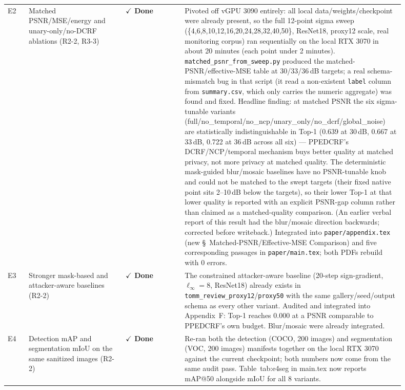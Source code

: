 \documentclass[11pt]{article}
\newcommand{\done}{\textcolor{DoneGreen}{\textbf{$\checkmark$ Done}}}
\begin{document}
\begin{longtable}{@{}p{0.05\linewidth}p{0.23\linewidth}p{0.14\linewidth}p{0.48\linewidth}@{}}
E2 & Matched PSNR/MSE/energy and unary-only/no-DCRF ablations (R2-2, R3-3) & \done & Pivoted off vGPU 3090 entirely: all local data/weights/checkpoint were already present, so the full 12-point sigma sweep (\{4,6,8,10,12,16,20,24,28,32,40,50\}, ResNet18, proxy12 scale, real monitoring corpus) ran sequentially on the local RTX 3070 in about 20 minutes (each point under 2 minutes). \texttt{matched\_psnr\_from\_sweep.py} produced the matched-PSNR/effective-MSE table at 30/33/36\,dB targets; a real schema-mismatch bug in that script (it read a non-existent \texttt{label} column from \texttt{summary.csv}, which only carries the numeric aggregate) was found and fixed. Headline finding: at matched PSNR the six sigma-tunable variants (full/no\_temporal/no\_ncp/unary\_only/no\_dcrf/global\_noise) are statistically indistinguishable in Top-1 (0.639 at 30\,dB, 0.667 at 33\,dB, 0.722 at 36\,dB across all six) --- PPEDCRF's DCRF/NCP/temporal mechanism buys better quality at matched privacy, not more privacy at matched quality. The deterministic mask-guided blur/mosaic baselines have no PSNR-tunable knob and could not be matched to the swept targets (their fixed native point sits 2--10\,dB below the targets), so their lower Top-1 at that lower quality is reported with an explicit PSNR-gap column rather than claimed as a matched-quality comparison. (An earlier verbal report of this result had the blur/mosaic direction backwards; corrected before writeback.) Integrated into \texttt{paper/appendix.tex} (new \S~Matched-PSNR/Effective-MSE Comparison) and five corresponding passages in \texttt{paper/main.tex}; both PDFs rebuild with 0 errors. \\
E3 & Stronger mask-based and attacker-aware baselines (R2-2) & \done & The constrained attacker-aware baseline (20-step sign-gradient, $\ell_\infty{=}8$, ResNet18) already exists in \texttt{tomm\_review\_proxy12}/\texttt{proxy50} with the same gallery/seed/output schema as every other variant. Audited and integrated into Appendix~F: Top-1 reaches 0.000 at a PSNR comparable to PPEDCRF's own budget. Blur/mosaic were already integrated. \\
E4 & Detection mAP and segmentation mIoU on the same sanitized images (R2-2) & \done & Re-ran both the detection (COCO, 200 images) and segmentation (VOC, 200 images) manifests together on the local RTX 3070 against the current checkpoint; both numbers now come from the same audit pass. Table~tab:e4seg in main.tex now reports mAP@50 alongside mIoU for all 8 variants. \\

\end{longtable}
\end{document}
